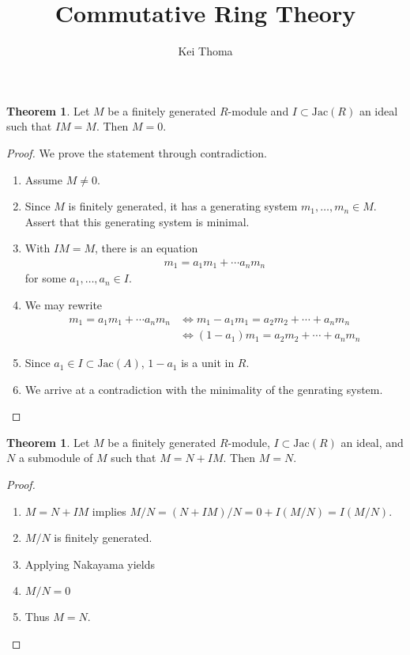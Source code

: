 \documentclass[a4paper]{book}
\title{Commutative Ring Theory}
\author{Kei Thoma}
\theoremstyle{definition}
\newtheorem{theorem}[definition]{Theorem}
\begin{document}
\begin{thmbox}
    \begin{theorem}
        Let \(M\) be a finitely generated \(R\)-module and \(I \subset \text{Jac}(R)\) an ideal such that \(IM = M\). Then \(M = 0\).
    \end{theorem}
\end{thmbox}
\begin{proof}
    We prove the statement through contradiction.
    \begin{enumerate}
        \item Assume \(M \neq 0\).
        \item Since \(M\) is finitely generated, it has a generating system \(m_1, \ldots, m_n \in M\). Assert that this generating system is minimal.
        \item With \(IM = M\), there is an equation \begin{align*}
            m_1 = a_1 m_1 + \cdots a_n m_n
        \end{align*}
        for some \(a_1, \ldots, a_n \in I\).
        \item We may rewrite \begin{align*}
            m_1 = a_1 m_1 + \cdots a_n m_n &\iff m_1 - a_1 m_1 = a_2 m_2 + \cdots + a_n m_n \\
            &\iff (1 - a_1) m_1 = a_2 m_2 + \cdots + a_n m_n
        \end{align*}
        \item Since \(a_1 \in I \subset \text{Jac}(A)\), \(1 - a_1\) is a unit in \(R\).
        \item We arrive at a contradiction with the minimality of the genrating system.
    \end{enumerate}
\end{proof}




\begin{thmbox}
    \begin{theorem}
        Let \(M\) be a finitely generated \(R\)-module, \(I \subset \text{Jac}(R)\) an ideal, and \(N\) a submodule of \(M\) such that \(M = N + IM\). Then \(M = N\).
    \end{theorem}
\end{thmbox}
\begin{proof}
    \begin{enumerate}
        \item \(M = N + IM\) implies \(M/N = (N + IM) / N = 0 + I (M/N) = I(M/N)\).
        \item \(M/N\) is finitely generated.
        \item Applying Nakayama yields
        \item \(M/N = 0\)
        \item Thus \(M = N\).
    \end{enumerate}
\end{proof}
\end{document}
